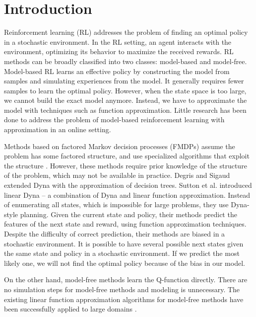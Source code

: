 
\chapter{Introduction}
\label{ch:intro}

Reinforcement learning (RL) addresses the problem of finding an optimal policy in a stochastic environment.
In the RL setting, an agent interacts with the environment, optimizing its behavior to
maximize the received rewards.
RL methods can be broadly classified into two classes: model-based and
model-free.  Model-based RL learns an effective policy by
constructing the model from samples and simulating experiences from the model. It
generally requires fewer samples to learn the optimal policy. However, when the
state space is too large, we cannot build the exact model anymore. Instead, we
have to approximate the model with techniques such as function approximation. Little 
research has been done to address the problem of model-based reinforcement learning with approximation in
an online setting.

Methods based on factored Markov decision processes (FMDPs) assume the problem has some factored structure, and use 
specialized algorithms that exploit the structure \cite{ApproxFactor} \cite{SPUDD}. 
However, these methods require prior knowledge
of the structure of the problem, which may not be available in practice.
Degris and Sigaud \cite{ApproxTree} extended Dyna \cite{Dyna} with the approximation of decision trees.
Sutton et al. \cite{ApproxDyna} introduced linear Dyna -- a combination 
of Dyna and linear function approximation. 
Instead of enumerating all states, which is impossible for large problems, they
use Dyna-style planning. Given the current state and policy, 
their methods predict the features of the next state and reward, using function approximation
techniques. Despite the difficulty of correct prediction, their methods are biased 
in a stochastic environment. It is possible to have
several possible next states given the same state and policy in a stochastic environment.
If we predict the most likely one, we will not find the optimal policy because of the bias in our model.

On the other hand, model-free methods learn the Q-function directly. 
There are no simulation steps for model-free methods and modeling is unnecessary. 
The existing linear function approximation algorithms for model-free methods have been successfully 
applied to large domains \cite{LSTD99}\cite{KeepAway}. 

